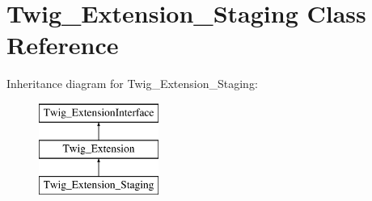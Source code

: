 \hypertarget{class_twig___extension___staging}{}\section{Twig\+\_\+\+Extension\+\_\+\+Staging Class Reference}
\label{class_twig___extension___staging}
Inheritance diagram for Twig\+\_\+\+Extension\+\_\+\+Staging\+:\begin{figure}[H]
\begin{center}
\leavevmode
\includegraphics[height=3.000000cm]{class_twig___extension___staging}
\end{center}
\end{figure}

